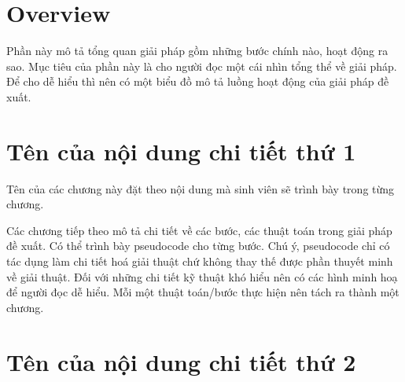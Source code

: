 \documentclass[../main.tex]{subfiles}
\begin{document}
\section{Overview}

Phần này mô tả tổng quan giải pháp gồm những bước chính nào, hoạt động ra sao. Mục tiêu của phần này là cho người đọc một cái nhìn tổng thể về giải pháp. Để cho dễ hiểu thì nên có một biểu đồ mô tả luồng hoạt động của giải pháp đề xuất. 

\section{Tên của nội dung chi tiết thứ 1}
Tên của các chương này đặt theo nội dung mà sinh viên sẽ trình bày trong từng chương. 

Các chương tiếp theo mô tả chi tiết về các bước, các thuật toán trong giải pháp đề xuất. Có thể trình bày pseudocode cho từng bước. Chú ý, pseudocode chỉ có tác dụng làm chi tiết hoá giải thuật chứ không thay thế được phần thuyết minh về giải thuật. Đối với những chi tiết kỹ thuật khó hiểu nên có các hình minh hoạ để người đọc dễ hiểu. Mỗi một thuật toán/bước thực hiện nên tách ra thành một chương. 

\section{Tên của nội dung chi tiết thứ 2}
\end{document}
